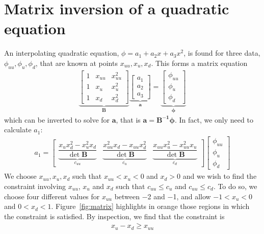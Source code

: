 \documentclass{article}
\newcommand{\vect}{\bm}
\begin{document}
\section{Matrix inversion of a quadratic equation}
\label{sec:matrix}
An interpolating quadratic equation, $\phi = a_1 + a_2 x + a_3 x^2$, is found for three data, $\phi_{uu}, \phi_{u}, \phi_{d}$, that are known at points $x_{uu}, x_{u}, x_{d}$.  This forms a matrix equation
\begin{align}
\underbrace{
\begin{bmatrix}
1 & x_{uu} & x_{uu}^2 \\
1 & x_u & x_u^2 \\
1 & x_d & x_d^2
\end{bmatrix}}_{\vect{B}}
\underbrace{
\begin{bmatrix}
a_1 \\
a_2 \\
a_3
\end{bmatrix}}_{\vect{a}}
= 
\underbrace{
\begin{bmatrix}
\phi_{uu} \\
\phi_{u} \\
\phi_{d}
\end{bmatrix}
}_{\vect{\phi}}
\end{align}
which can be inverted to solve for $\vect{a}$, that is $\vect{a} = \vect{B^{-1}} \vect{\phi}$.
In fact, we only need to calculate $a_1$:
\begin{align}
a_1 = 
\begin{bmatrix}
\underbrace{\dfrac{x_u x_d^2 - x_u^2 x_d}{\det \vect{B}}}_{c_{uu}} &
\underbrace{\dfrac{x_{uu}^2 x_d - x_{uu} x_d^2}{\det \vect{B}}}_{c_u} &
\underbrace{\dfrac{x_{uu} x_u^2 - x_{uu}^2 x_u}{\det \vect{B}}}_{c_d}
\end{bmatrix}
\begin{bmatrix}
\phi_{uu} \\
\phi_{u} \\
\phi_{d}
\end{bmatrix}
\end{align}
We choose $x_{uu}, x_u, x_d$ such that $x_{uu} < x_u < 0$ and $x_d > 0$ and we wish to find the constraint involving $x_{uu}$, $x_u$ and $x_d$ such that $c_{uu} \leq c_u$ and $c_{uu} \leq c_d$.
To do so, we choose four different values for $x_{uu}$ between \num{-2} and \num{-1}, and allow $-1 < x_u < 0$ and $0 < x_d < 1$.  Figure~\ref{fig:matrix} highlights in orange those regions in which the constraint is satisfied.  By inspection, we find that the constraint is
\begin{align}
	x_u - x_d \geq x_{uu} \label{eqn:matrix-constraint}
\end{align}
\end{document}
